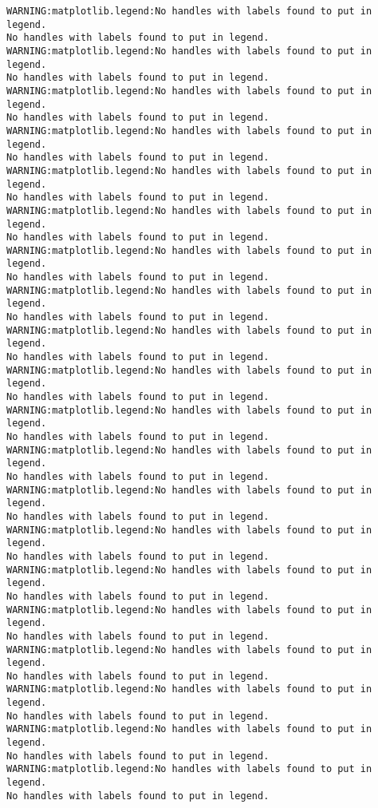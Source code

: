 \begin{Verbatim}[commandchars=\\\{\}]
WARNING:matplotlib.legend:No handles with labels found to put in legend.
No handles with labels found to put in legend.
WARNING:matplotlib.legend:No handles with labels found to put in legend.
No handles with labels found to put in legend.
WARNING:matplotlib.legend:No handles with labels found to put in legend.
No handles with labels found to put in legend.
WARNING:matplotlib.legend:No handles with labels found to put in legend.
No handles with labels found to put in legend.
WARNING:matplotlib.legend:No handles with labels found to put in legend.
No handles with labels found to put in legend.
WARNING:matplotlib.legend:No handles with labels found to put in legend.
No handles with labels found to put in legend.
WARNING:matplotlib.legend:No handles with labels found to put in legend.
No handles with labels found to put in legend.
WARNING:matplotlib.legend:No handles with labels found to put in legend.
No handles with labels found to put in legend.
WARNING:matplotlib.legend:No handles with labels found to put in legend.
No handles with labels found to put in legend.
WARNING:matplotlib.legend:No handles with labels found to put in legend.
No handles with labels found to put in legend.
WARNING:matplotlib.legend:No handles with labels found to put in legend.
No handles with labels found to put in legend.
WARNING:matplotlib.legend:No handles with labels found to put in legend.
No handles with labels found to put in legend.
WARNING:matplotlib.legend:No handles with labels found to put in legend.
No handles with labels found to put in legend.
WARNING:matplotlib.legend:No handles with labels found to put in legend.
No handles with labels found to put in legend.
WARNING:matplotlib.legend:No handles with labels found to put in legend.
No handles with labels found to put in legend.
WARNING:matplotlib.legend:No handles with labels found to put in legend.
No handles with labels found to put in legend.
WARNING:matplotlib.legend:No handles with labels found to put in legend.
No handles with labels found to put in legend.
WARNING:matplotlib.legend:No handles with labels found to put in legend.
No handles with labels found to put in legend.
WARNING:matplotlib.legend:No handles with labels found to put in legend.
No handles with labels found to put in legend.
WARNING:matplotlib.legend:No handles with labels found to put in legend.
No handles with labels found to put in legend.
    \end{Verbatim}

    \begin{center}
    \end{center}
    { \hspace*{\fill} \\}
    
